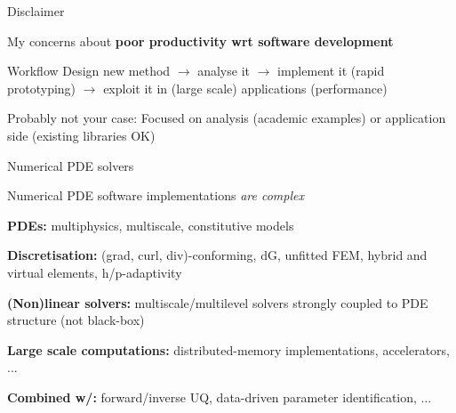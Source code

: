 
\begin{frame}{Disclaimer}


My concerns about \textbf{poor productivity wrt software development}

\vspace{0.2cm}

\begin{block}{Workflow}
  Design new method $\rightarrow$ analyse it $\rightarrow$ implement it (rapid prototyping) $\rightarrow$ exploit it in (large scale) applications (performance)
\end{block}

\vspace{0.2cm}

Probably not your case: Focused on analysis (academic examples) or application side (existing libraries OK)

\end{frame}

% 

\begin{frame}{Numerical PDE solvers}

  Numerical PDE software implementations \emph{are complex}

{{\bfseries PDEs:}} multiphysics, multiscale, constitutive models

{\textbf{Discretisation:}} (grad, curl, div)-conforming, dG, unfitted FEM, hybrid and virtual elements, h/p-adaptivity

{\textbf{(Non)linear solvers:}} multiscale/multilevel solvers strongly coupled to PDE structure (not black-box)

{\textbf{Large scale computations:}} distributed-memory implementations, accelerators, ...

{\textbf{Combined w/:}} forward/inverse UQ, data-driven parameter identification, ...

\end{frame}

%
%
%
%
%


